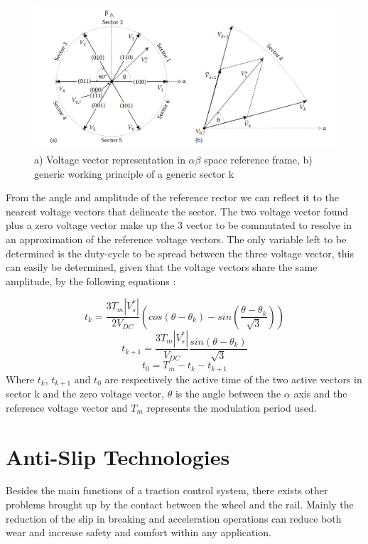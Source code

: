 \begin{figure}[h]
    \centering
    \includegraphics[scale = 0.45]{Figures/SVM_Vectors.png}
    \caption{a) Voltage vector representation in $\alpha \beta$ space reference frame, b) generic working principle of a generic sector k \cite{Mohan}}
    \label{fig:SVMVectors}
\end{figure} 

From the angle and amplitude of the reference rector we can reflect it to the nearest voltage vectors that delineate the sector. The two voltage vector found plus a zero voltage vector make up the 3 vector to be commutated to resolve in an approximation of the reference voltage vectors. The only variable left to be determined is the duty-cycle to be spread between the three voltage vector, this can easily be determined, given that the voltage vectors share the same amplitude, by the following equations \cite{Mohan}:

\begin{equation}
t_k = \frac{3T_m|V_s^*|}{2V_{DC}}(cos(\theta-\theta_k) - sin(\frac{\theta -\theta_k}{\sqrt{3}}))
\end{equation}
\begin{equation}
t_{k+1} = \frac{3T_m|V_s^*|}{V_{DC}}\frac{sin(\theta -\theta_k)}{\sqrt{3}}
\end{equation}
\begin{equation}
t_0 = T_m - t_k - t_{k+1}
\end{equation}
Where $t_k$, $t_{k+1}$ and $t_0$ are respectively the active time of the two active vectors in sector k and the zero voltage vector, $\theta$ is the angle between the $\alpha$ axis and the reference voltage vector and $T_m$ represents the modulation period used.
\section{Anti-Slip Technologies}
Besides the main functions of a traction control system, there exists other problems brought up by the contact between the wheel and the rail. Mainly the reduction of the slip in breaking and acceleration operations can reduce both wear and increase safety and comfort within any application. 

